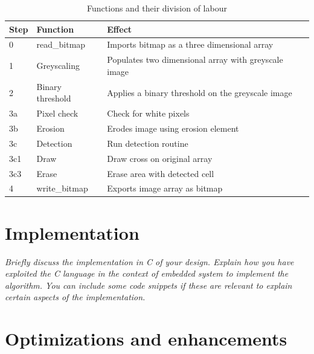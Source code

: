 \documentclass[a4paper, english]{article}
\numberwithin{equation}{section}
\begin{document}
\begin{table}
    \centering
    \caption{Functions and their division of labour}\label{tbl:func}
    \begin{tabular}{lll}
        \toprule
        Step & Function         & Effect                                               \\
        \midrule
        0    & read\_bitmap     & Imports bitmap as a three dimensional array          \\
        1    & Greyscaling      & Populates two dimensional array with greyscale image \\
        2    & Binary threshold & Applies a binary threshold on the greyscale image    \\
        3a   & Pixel check      & Check for white pixels                               \\
        3b   & Erosion          & Erodes image using erosion element                   \\
        3c   & Detection        & Run detection routine                                \\
        3c1  & Draw             & Draw cross on original array                         \\
        3c3  & Erase            & Erase area with detected cell                        \\
        4    & write\_bitmap    & Exports image array as bitmap                        \\
        \bottomrule
    \end{tabular}
\end{table}
\section{Implementation}\label{sec:implementation}
\textit{Briefly discuss the implementation in C of your design. Explain how you have exploited the C language in the context of embedded system to implement the algorithm. You can include some code snippets if these are relevant to explain certain aspects of the implementation.}
\section{Optimizations and enhancements}
\end{document}
